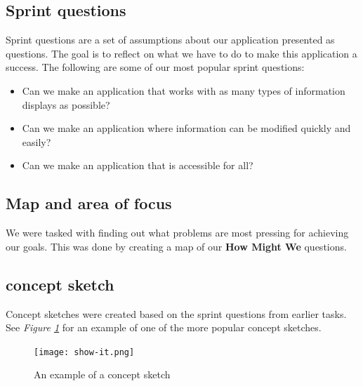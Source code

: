 \documentclass[12pt]{article}
\begin{document}
\subsection{Sprint questions}
Sprint questions are a set of assumptions about our application presented as questions.
The goal is to reflect on what we have to do to make this application a success.
The following are some of our most popular sprint questions:
\begin{itemize}
    \item Can we make an application that works with as many types of information displays as possible?
    \item Can we make an application where information can be modified quickly and easily?
    \item Can we make an application that is accessible for all?
\end{itemize}
\subsection{Map and area of focus}
We were tasked with finding out what problems are most pressing for achieving our goals.
This was done by creating a map of our \textbf{How Might We}\cite{WhatHowMight} questions.
\subsection{concept sketch}
Concept sketches were created based on the sprint questions from earlier tasks.
See \textit{Figure \ref{fig:SH}} for an example of one of the more popular concept sketches.
\begin{figure}[h]
    \begin{adjustwidth}{-1in}{-1in}
        \centering
        \texttt{[image: show-it.png]}
        \caption{An example of a concept sketch}
        \label{fig:SH}
    \end{adjustwidth}
\end{figure}
\clearpage
\end{document}
